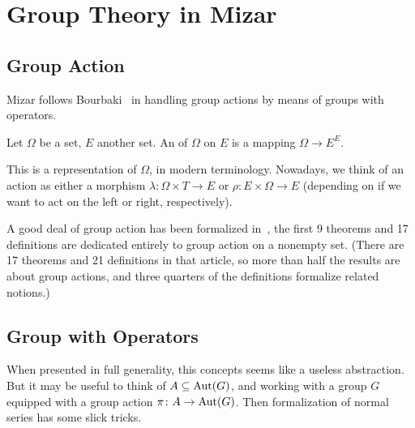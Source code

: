 \chapter{Group Theory in Mizar}












\section{Group Action}

Mizar follows Bourbaki~\cite{bourbaki1974elements} in handling group
actions by means of groups with operators.

\begin{definition}
Let $\Omega$ be a set, $E$ another set. An  of $\Omega$
on $E$ is a mapping $\Omega\to E^{E}$.
\end{definition}

\begin{def-remark}
This is a representation of $\Omega$, in modern terminology. Nowadays,
we think of an action as either a morphism $\lambda\colon\Omega\times T\to E$
or $\rho\colon E\times\Omega\to E$ (depending on if we want to act on
the left or right, respectively).
\end{def-remark}

\begin{def-remark}
A good deal of group action has been formalized in~, the
first 9 theorems and 17 definitions are dedicated entirely to group
action on a nonempty set. (There are 17 theorems and 21 definitions in
that article, so more than half the results are about group actions, and
three quarters of the definitions formalize related notions.)
\end{def-remark}

\section{Group with Operators}

When presented in full generality, this concepts seems like a useless
abstraction. But it may be useful to think of $A\subseteq\operatorname{Aut}(G)$, and
working with a group $G$ equipped with a group action $\pi\colon A\to\operatorname{Aut}(G)$.
Then formalization of normal series has some slick tricks.

